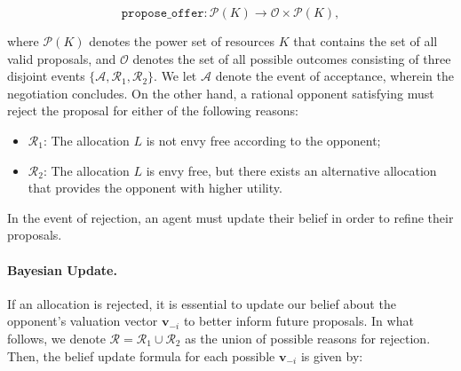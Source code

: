 $$
\texttt{propose\_offer}: \mathcal{P}(K) \rightarrow \mathcal{O} \times \mathcal{P}(K),
$$

where $\mathcal{P}(K)$ denotes the power set of resources $K$ that contains the set of all valid proposals, and $\mathcal{O}$ denotes the set of all possible outcomes consisting of three disjoint events $\{\mathcal{A}, \mathcal{R}_1, \mathcal{R}_2\}$. We let $\mathcal{A}$ denote the event of acceptance, wherein the negotiation concludes. On the other hand, a rational opponent satisfying  must reject the proposal for either of the following reasons:

\begin{itemize} 
\item $\mathcal{R}_1$: \hspace{0.7mm}The allocation $L$ is not envy free according to the opponent;
\item $\mathcal{R}_2$: The allocation $L$ is envy free, but there exists an alternative allocation that provides the opponent with higher utility. 
\end{itemize}

In the event of rejection, an agent must update their belief in order to refine their proposals.

\paragraph{Bayesian Update.} If an allocation is rejected, it is essential to update our belief about the opponent's valuation vector $\mathbf{v}_{-i}$ to better inform future proposals. In what follows, we denote $\mathcal{R} = \mathcal{R}_1 \cup \mathcal{R}_2$ as the union of possible reasons for rejection. Then, the belief update formula \citep{cripps2018divisible} for each possible $\mathbf{v}_{-i}$ is given by:

